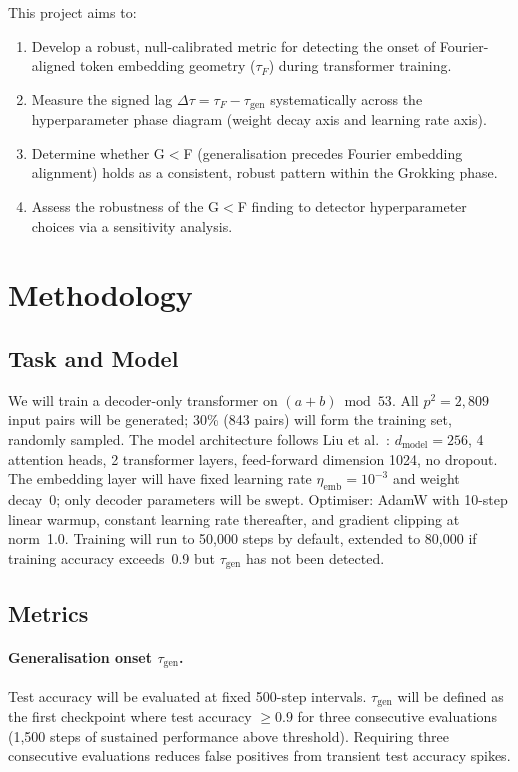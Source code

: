 \documentclass[12pt,openany,a4paper]{book}
\newcommand{\taug}{\tau_{\mathrm{gen}}}
\newcommand{\tauf}{\tau_{F}}
\newcommand{\Dtau}{\Delta\tau}
\begin{document}
This project aims to:
\begin{enumerate}
  \item Develop a robust, null-calibrated metric for detecting the
    onset of Fourier-aligned token embedding geometry ($\tauf$) during
    transformer training.
  \item Measure the signed lag $\Dtau = \tauf - \taug$ systematically
    across the hyperparameter phase diagram (weight decay axis and
    learning rate axis).
  \item Determine whether G$<$F (generalisation precedes Fourier
    embedding alignment) holds as a consistent, robust pattern within
    the Grokking phase.
  \item Assess the robustness of the G$<$F finding to detector
    hyperparameter choices via a sensitivity analysis.
\end{enumerate}

\section{Methodology}

\subsection{Task and Model}

We will train a decoder-only transformer \cite{vaswani2017attention}
on $(a+b)\bmod 53$.
All $p^2 = 2{,}809$ input pairs will be generated; 30\% (843 pairs)
will form the training set, randomly sampled.
The model architecture follows Liu et al.\ \cite{liu2022towards}:
$d_{\mathrm{model}}=256$, 4 attention heads, 2 transformer layers,
feed-forward dimension 1024, no dropout.
The embedding layer will have fixed learning rate $\eta_{\mathrm{emb}}
= 10^{-3}$ and weight decay~0; only decoder parameters will be swept.
Optimiser: AdamW with 10-step linear warmup, constant learning rate
thereafter, and gradient clipping at norm~1.0.
Training will run to 50{,}000 steps by default, extended to 80{,}000
if training accuracy exceeds~0.9 but $\taug$ has not been detected.

\subsection{Metrics}

\paragraph{Generalisation onset $\taug$.}
Test accuracy will be evaluated at fixed 500-step intervals.
$\taug$ will be defined as the first checkpoint where test accuracy
$\geq 0.9$ for three consecutive evaluations (1{,}500 steps of
sustained performance above threshold).
Requiring three consecutive evaluations reduces false positives from
transient test accuracy spikes.
\end{document}
